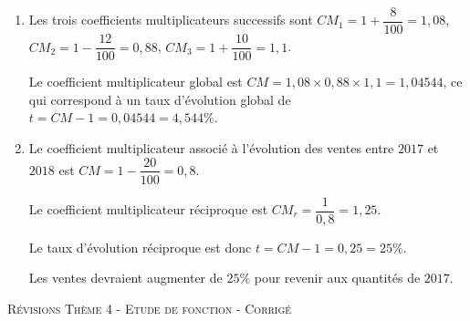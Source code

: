 \documentclass[a4paper]{article}
\begin{document}
    \medskip

    \begin{enumerate}
      \item Les trois coefficients multiplicateurs successifs sont $CM_1=1+\dfrac{8}{100}=1,08$,
       $CM_2=1-\dfrac{12}{100}=0,88$,
       $CM_3=1+\dfrac{10}{100}=1,1$.

       Le coefficient multiplicateur global est $CM=1,08\times0,88\times1,1=1,04544$, ce qui correspond 
       à un taux d'évolution global de $t=CM-1=0,04544=4,544\%$.

       \item Le coefficient multiplicateur associé à l'évolution des ventes entre $2017$ et $2018$ est $CM=1-\dfrac{20}{100}=0,8$.

       Le coefficient multiplicateur réciproque est $CM_r=\dfrac{1}{0,8}=1,25$.

       Le taux d'évolution réciproque est donc $t=CM-1=0,25=25\%$.

       Les ventes devraient augmenter de $25\%$ pour revenir aux quantités de $2017$.
    \end{enumerate}

    \pagebreak


\begin{center}
    {\scshape\LARGE Révisions Thème 4 - Etude de fonction - Corrigé\par}
    \vspace{0.5cm}
  \end{center}

  \setcounter{exercice}{0}
\end{document}
